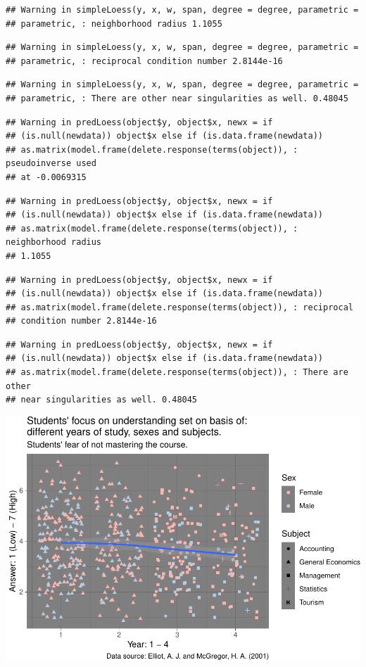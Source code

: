 \documentclass[]{article}
\begin{document}
\begin{verbatim}
## Warning in simpleLoess(y, x, w, span, degree = degree, parametric =
## parametric, : neighborhood radius 1.1055
\end{verbatim}

\begin{verbatim}
## Warning in simpleLoess(y, x, w, span, degree = degree, parametric =
## parametric, : reciprocal condition number 2.8144e-16
\end{verbatim}

\begin{verbatim}
## Warning in simpleLoess(y, x, w, span, degree = degree, parametric =
## parametric, : There are other near singularities as well. 0.48045
\end{verbatim}

\begin{verbatim}
## Warning in predLoess(object$y, object$x, newx = if
## (is.null(newdata)) object$x else if (is.data.frame(newdata))
## as.matrix(model.frame(delete.response(terms(object)), : pseudoinverse used
## at -0.0069315
\end{verbatim}

\begin{verbatim}
## Warning in predLoess(object$y, object$x, newx = if
## (is.null(newdata)) object$x else if (is.data.frame(newdata))
## as.matrix(model.frame(delete.response(terms(object)), : neighborhood radius
## 1.1055
\end{verbatim}

\begin{verbatim}
## Warning in predLoess(object$y, object$x, newx = if
## (is.null(newdata)) object$x else if (is.data.frame(newdata))
## as.matrix(model.frame(delete.response(terms(object)), : reciprocal
## condition number 2.8144e-16
\end{verbatim}

\begin{verbatim}
## Warning in predLoess(object$y, object$x, newx = if
## (is.null(newdata)) object$x else if (is.data.frame(newdata))
## as.matrix(model.frame(delete.response(terms(object)), : There are other
## near singularities as well. 0.48045
\end{verbatim}

\includegraphics{StudentGoals_files/figure-latex/unnamed-chunk-16-1.pdf}
\end{document}
